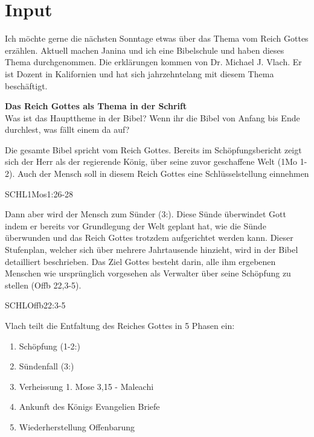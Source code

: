 \documentclass{../../inc/mybib}
\begin{document}
\section{ Input }
\begin{spacing}{1.5}    
  \begin{block}[Einleitung]
    Ich möchte gerne die nächsten Sonntage etwas über das Thema vom Reich Gottes erzählen. Aktuell machen Janina und ich eine Bibelschule und haben dieses Thema durchgenommen. Die erklärungen kommen von Dr. Michael J. Vlach. Er ist Dozent in Kalifornien und hat sich jahrzehntelang mit diesem Thema beschäftigt.
    
  \end{block}
  
   \textbf{Das Reich Gottes als Thema in der Schrift}\\
   Was ist das Haupttheme in der Bibel? Wenn ihr die Bibel von Anfang bis Ende durchlest, was fällt einem da auf?

   Die gesamte Bibel spricht vom Reich Gottes. Bereits im Schöpfungsbericht zeigt sich der
   Herr als der regierende König, über seine zuvor geschaffene Welt (1Mo 1-2). Auch der
   Mensch soll in diesem Reich Gottes eine Schlüsselstellung einnehmen   
    \begin{bibelbox}{SCHL}{1Mos}{1:26-28}

    \end{bibelbox}
   Dann aber wird der Mensch zum Sünder (3:). Diese Sünde überwindet Gott indem er
   bereits vor Grundlegung der Welt geplant hat, wie die Sünde überwunden und das Reich
   Gottes trotzdem aufgerichtet werden kann. Dieser Stufenplan, welcher sich über mehrere
   Jahrtausende hinzieht, wird in der Bibel detailliert beschrieben.
   Das Ziel Gottes besteht darin, alle ihm ergebenen Menschen wie ursprünglich
   vorgesehen als Verwalter über seine Schöpfung zu stellen (Offb 22,3-5).
   \begin{bibelbox}{SCHL}{Offb}{22:3-5}

   \end{bibelbox}
   Vlach teilt die Entfaltung des Reiches Gottes in 5 Phasen ein:
   
   \begin{enumerate}
    \item Schöpfung (1-2:)
    \item Sündenfall (3:)
    \item Verheissung 1. Mose 3,15 - Maleachi
    \item Ankunft des Königs Evangelien Briefe
    \item Wiederherstellung Offenbarung
   \end{enumerate}


\end{spacing}
\end{document}

